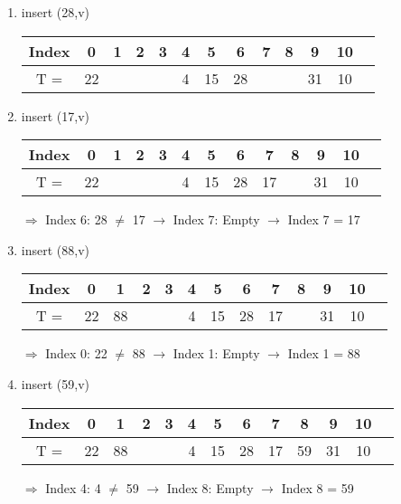 \begin{enumerate}
\item insert (28,v)

\begin{center}
\begin{tabular}{|c|c|c|c|c|c|c|c|c|c|c|c|c|}
\hline
Index & 0 & 1 & 2 & 3 & 4 & 5 & 6 & 7 & 8 & 9 & 10\\
\hline
T = & 22 & & & & 4 & 15 & 28 & & & 31 & 10\\
\hline
\end{tabular}
\end{center}

\item insert (17,v)

\begin{center}
\begin{tabular}{|c|c|c|c|c|c|c|c|c|c|c|c|c|}
\hline
Index & 0 & 1 & 2 & 3 & 4 & 5 & 6 & 7 & 8 & 9 & 10\\
\hline
T = & 22 & & & & 4 & 15 & 28 & 17 & & 31 & 10\\
\hline
\end{tabular}
\end{center}
$\Rightarrow$ Index 6: 28 $\neq$ 17 $\rightarrow$ Index 7: Empty $\rightarrow$ Index 7 = 17

\item insert (88,v)

\begin{center}
\begin{tabular}{|c|c|c|c|c|c|c|c|c|c|c|c|c|}
\hline
Index & 0 & 1 & 2 & 3 & 4 & 5 & 6 & 7 & 8 & 9 & 10\\
\hline
T = & 22 & 88 & & & 4 & 15 & 28 & 17 & & 31 & 10\\
\hline
\end{tabular}
\end{center}
$\Rightarrow$ Index 0: 22 $\neq$ 88 $\rightarrow$ Index 1: Empty $\rightarrow$ Index 1 = 88

\item insert (59,v)

\begin{center}
\begin{tabular}{|c|c|c|c|c|c|c|c|c|c|c|c|c|}
\hline
Index & 0 & 1 & 2 & 3 & 4 & 5 & 6 & 7 & 8 & 9 & 10\\
\hline
T = & 22 & 88 & & & 4 & 15 & 28 & 17 & 59 & 31 & 10\\
\hline
\end{tabular}
\end{center}
$\Rightarrow$ Index 4: 4 $\neq$ 59 $\rightarrow$ Index 8: Empty $\rightarrow$ Index 8 = 59


\end{enumerate}


